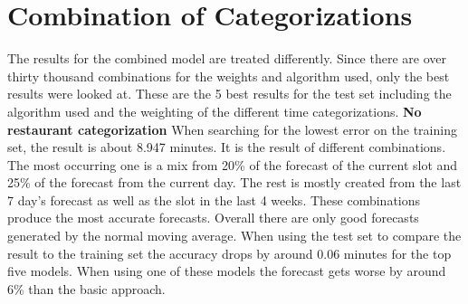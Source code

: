 \section{Combination of Categorizations}\label{section:Combination of Categorizations}
The results for the combined model are treated differently. Since there are over thirty thousand combinations for the weights and algorithm used, only the best results were looked at. These are the 5 best results for the test set including the algorithm used and the weighting of the different time categorizations.
\newline\newline\textbf{No restaurant categorization}\newline
When searching for the lowest error on the training set, the result is about 8.947 minutes. It is the result of different combinations. The most occurring one is a mix from 20\% of the forecast of the current slot and 25\% of the forecast from the current day. The rest is mostly created from the last 7 day’s forecast as well as the slot in the last 4 weeks. These combinations produce the most accurate forecasts. Overall there are only good forecasts generated by the normal moving average. When using the test set to compare the result to the training set the accuracy drops by around 0.06 minutes for the top five models.\newline
When using one of these models the forecast gets worse by around 6\% than the basic approach.
